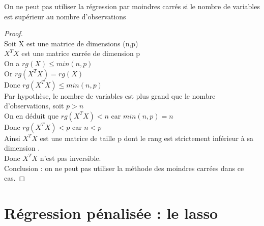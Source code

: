 \documentclass{article}
\begin{document}
	On ne peut pas utiliser la régression par moindres carrés si le 
	nombre de variables est supérieur au nombre d'observations
	\begin{proof}
		~\\Soit X est une matrice de dimensions (n,p)
		\vspace{2mm} %
		\\$X^{T}X$ est une matrice carrée de dimension p
		\vspace{2mm} %
		\\ On a $rg(X) \leq min(n,p)$ 
		\vspace{2mm} %
		\\Or $rg(X^{T}X) = rg(X)$
		\vspace{2mm} %
		\\Donc $rg(X^{T}X) \leq min(n,p)$
		\vspace{2mm} %
		\\Par hypothèse, le nombre de variables est plus grand que le nombre d'observations, soit $p > n$
		\vspace{2mm} %
		\\On en déduit que $rg(X^{T}X) < n $ car $min(n,p) = n$
		\vspace{2mm} %
		\\Donc $rg(X^{T}X) < p $ car $n < p$
		\vspace{2mm} %
		\\Ainsi $X^{T}X$ est une matrice de taille p dont le rang est strictement inférieur à sa dimension .
		\vspace{2mm} %
		\\Donc $X^{T}X$ n'est pas inversible.
		\vspace{2mm} %
		\\Conclusion : on ne peut pas utiliser la méthode des moindres carrées dans ce cas.
	\end{proof}
	
	\section{Régression pénalisée : le lasso}
	
\end{document}
